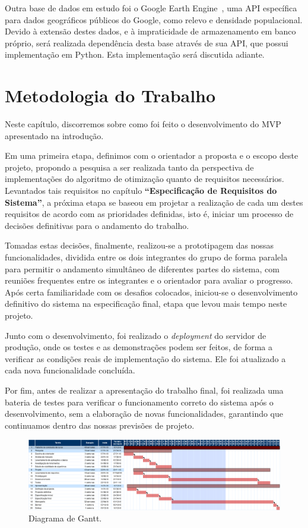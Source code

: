 \documentclass[]{politex}
\begin{document}
Outra base de dados em estudo foi o Google Earth Engine~\cite{earthengine}, uma
API específica para dados geográficos públicos do Google, como relevo e
densidade populacional. Devido à extensão destes dados, e à impraticidade de
armazenamento em banco próprio, será realizada dependência desta base através
de sua API, que possui implementação em Python. Esta implementação será
discutida adiante.

\chapter{Metodologia do Trabalho}

Neste capítulo, discorremos sobre como foi feito o desenvolvimento do MVP
apresentado na introdução.

Em uma primeira etapa, definimos com o orientador a proposta e o escopo deste
projeto, propondo a pesquisa a ser realizada tanto da perspectiva de
implementações do algoritmo de otimização quanto de requisitos necessários. Levantados tais requisitos no
capítulo \textbf{``Especificação de Requisitos do Sistema''}, a próxima etapa
se baseou em projetar a realização de cada um destes requisitos de acordo com as
prioridades definidas, isto é, iniciar um processo de decisões definitivas para
o andamento do trabalho.

Tomadas estas decisões, finalmente, realizou-se a prototipagem das nossas
funcionalidades, dividida entre os dois integrantes do grupo de forma paralela
para permitir o andamento simultâneo de diferentes partes do sistema, com reuniões
frequentes entre os integrantes e o orientador para avaliar o progresso. Após
certa familiaridade com os desafios colocados, iniciou-se o desenvolvimento definitivo do sistema na
especificação final, etapa que levou mais tempo neste projeto.

Junto com o desenvolvimento, foi realizado o \textit{deployment} do servidor de produção,
onde os testes e as demonstrações podem ser feitos, de forma a verificar as
condições reais de implementação do sistema. Ele foi atualizado a cada nova
funcionalidade concluída.

Por fim, antes de realizar a apresentação do trabalho final, foi realizada uma
bateria de testes para verificar o funcionamento correto do sistema após o
desenvolvimento, sem a elaboração de novas funcionalidades, garantindo que
continuamos dentro das nossas previsões de projeto.

\begin{figure}[H]
    \centering
    \includegraphics[width=6.5in]{imagens/diagrama_gantt}
    \caption{Diagrama de Gantt.}
    \label{fig:gantt}
\end{figure}
\end{document}
